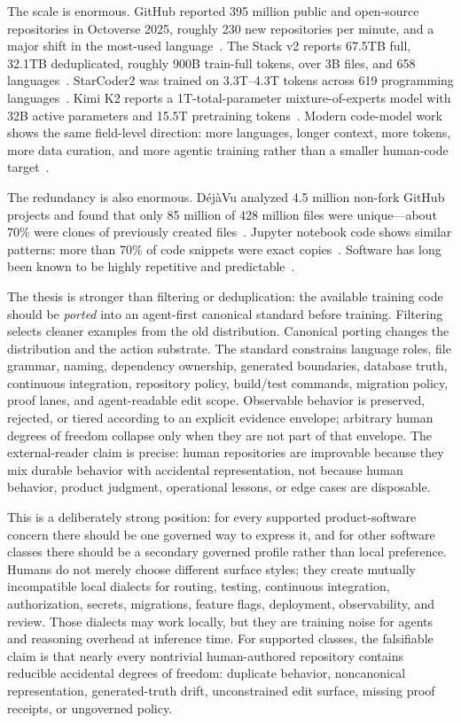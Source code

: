 The scale is enormous. GitHub reported 395 million public and open-source repositories in Octoverse 2025, roughly 230 new repositories per minute, and a major shift in the most-used language~\cite{octoverse2025}. The Stack v2 reports 67.5TB full, 32.1TB deduplicated, roughly 900B train-full tokens, over 3B files, and 658 languages~\cite{theStackV2}. StarCoder2 was trained on 3.3T--4.3T tokens across 619 programming languages~\cite{starcoder2}. Kimi K2 reports a 1T-total-parameter mixture-of-experts model with 32B active parameters and 15.5T pretraining tokens~\cite{kimiK2,kimiDocs}. Modern code-model work shows the same field-level direction: more languages, longer context, more tokens, more data curation, and more agentic training rather than a smaller human-code target~\cite{deepseekCoder,qwenCoder}.

The redundancy is also enormous. D\'{e}j\`{a}Vu analyzed 4.5 million non-fork GitHub projects and found that only 85 million of 428 million files were unique---about 70\% were clones of previously created files~\cite{dejavu2017}. Jupyter notebook code shows similar patterns: more than 70\% of code snippets were exact copies~\cite{jupyterClones2020}. Software has long been known to be highly repetitive and predictable~\cite{hindleNaturalness}.

The thesis is stronger than filtering or deduplication: the available training code should be \emph{ported} into an agent-first canonical standard before training. Filtering selects cleaner examples from the old distribution. Canonical porting changes the distribution and the action substrate. The standard constrains language roles, file grammar, naming, dependency ownership, generated boundaries, database truth, continuous integration, repository policy, build/test commands, migration policy, proof lanes, and agent-readable edit scope. Observable behavior is preserved, rejected, or tiered according to an explicit evidence envelope; arbitrary human degrees of freedom collapse only when they are not part of that envelope. The external-reader claim is precise: human repositories are improvable because they mix durable behavior with accidental representation, not because human behavior, product judgment, operational lessons, or edge cases are disposable.

This is a deliberately strong position: for every supported product-software concern there should be one governed way to express it, and for other software classes there should be a secondary governed profile rather than local preference. Humans do not merely choose different surface styles; they create mutually incompatible local dialects for routing, testing, continuous integration, authorization, secrets, migrations, feature flags, deployment, observability, and review. Those dialects may work locally, but they are training noise for agents and reasoning overhead at inference time. For supported classes, the falsifiable claim is that nearly every nontrivial human-authored repository contains reducible accidental degrees of freedom: duplicate behavior, noncanonical representation, generated-truth drift, unconstrained edit surface, missing proof receipts, or ungoverned policy.

